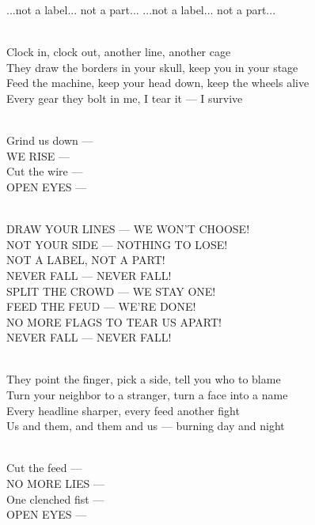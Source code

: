 \begin{lyrics}
...not a label... not a part...
...not a label... not a part...

\\
Clock in, clock out, another line, another cage\\
They draw the borders in your skull, keep you in your stage\\
Feed the machine, keep your head down, keep the wheels alive\\
Every gear they bolt in me, I tear it — I survive

\\
Grind us down —\\
WE RISE —\\
Cut the wire —\\
OPEN EYES —

\\
DRAW YOUR LINES — WE WON'T CHOOSE!\\
NOT YOUR SIDE — NOTHING TO LOSE!\\
NOT A LABEL, NOT A PART!\\
NEVER FALL — NEVER FALL!\\
SPLIT THE CROWD — WE STAY ONE!\\
FEED THE FEUD — WE'RE DONE!\\
NO MORE FLAGS TO TEAR US APART!\\
NEVER FALL — NEVER FALL!

\\
They point the finger, pick a side, tell you who to blame\\
Turn your neighbor to a stranger, turn a face into a name\\
Every headline sharper, every feed another fight\\
Us and them, and them and us — burning day and night

\\
Cut the feed —\\
NO MORE LIES —\\
One clenched fist —\\
OPEN EYES —


\end{lyrics}
